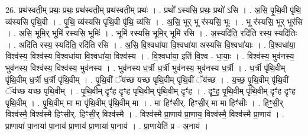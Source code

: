 \documentclass[17pt]{extarticle}
\begin{document}
26. प्रथ॑स्वती॒म् प्रथः॒ प्रथः॒ प्रथ॑स्वती॒म् प्रथ॑स्वती॒म् प्रथः॑ । . प्रथो᳚ ऽस्यसि॒ प्रथः॒ प्रथो॑ ऽसि । . अ॒सि॒ पृ॒थि॒वी पृ॑थि॒ व्य॑स्यसि पृथि॒वी । . पृ॒थि॒ व्य॑स्यसि पृथि॒वी पृ॑थि॒ व्य॑सि । . अ॒सि॒ भूर् भू र॑स्यसि॒ भूः । . भू र॑स्यसि॒ भूर् भूर॑सि । . अ॒सि॒ भूमि॒र् भूमि॑ रस्यसि॒ भूमिः॑ । . भूमि॑ रस्यसि॒ भूमि॒र् भूमि॑ रसि । . अ॒स्यदि॑ति॒ रदि॑ति रस्य॒ स्यदि॑तिः । . अदि॑ति रस्य॒ स्यदि॑ति॒ रदि॑ति रसि । . अ॒सि॒ वि॒श्वधा॑या वि॒श्वधा॑या अस्यसि वि॒श्वधा॑याः । . वि॒श्वधा॑या॒ विश्व॑स्य॒ विश्व॑स्य वि॒श्वधा॑या वि॒श्वधा॑या॒ विश्व॑स्य । . वि॒श्वधा॑या॒ इति॑ वि॒श्व - धा॒याः॒ । . विश्व॑स्य॒ भुव॑नस्य॒ भुव॑नस्य॒ विश्व॑स्य॒ विश्व॑स्य॒ भुव॑नस्य । . भुव॑नस्य ध॒र्त्री ध॒र्त्री भुव॑नस्य॒ भुव॑नस्य ध॒र्त्री । . ध॒र्त्री पृ॑थि॒वीम् पृ॑थि॒वीम् ध॒र्त्री ध॒र्त्री पृ॑थि॒वीम् । . पृ॒थि॒वीं ॅय॑च्छ यच्छ पृथि॒वीम् पृ॑थि॒वीं ॅय॑च्छ । . य॒च्छ॒ पृ॒थि॒वीम् पृ॑थि॒वीं ॅय॑च्छ यच्छ पृथि॒वीम् । . पृ॒थि॒वीम् दृꣳ॑ह दृꣳह पृथि॒वीम् पृ॑थि॒वीम् दृꣳ॑ह । . दृꣳ॒॒ह॒ पृ॒थि॒वीम् पृ॑थि॒वीम् दृꣳ॑ह दृꣳह पृथि॒वीम् । . पृ॒थि॒वीम् मा मा पृ॑थि॒वीम् पृ॑थि॒वीम् मा । . मा हिꣳ॑सीर्. हिꣳसी॒र् मा मा हिꣳ॑सीः । . हिꣳ॒॒सी॒र् विश्व॑स्मै॒ विश्व॑स्मै हिꣳसीर्. हिꣳसी॒र् विश्व॑स्मै । . विश्व॑स्मै प्रा॒णाय॑ प्रा॒णाय॒ विश्व॑स्मै॒ विश्व॑स्मै प्रा॒णाय॑ । . प्रा॒णाया॑ पा॒नाया॑ पा॒नाय॑ प्रा॒णाय॑ प्रा॒णाया॑ पा॒नाय॑ । . प्रा॒णायेति॑ प्र - अ॒नाय॑ । \newline
\end{document}
